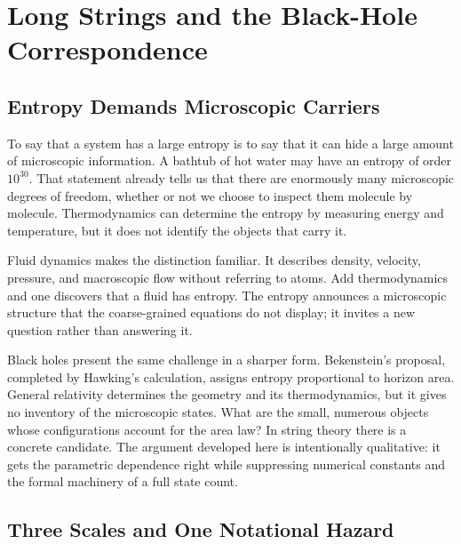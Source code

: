 \chapter{Long Strings and the Black-Hole Correspondence}


\section{Entropy Demands Microscopic Carriers}

To say that a system has a large entropy is to say that it can hide a large amount of microscopic information. A bathtub of hot water may have an entropy of order \(10^{30}\). That statement already tells us that there are enormously many microscopic degrees of freedom, whether or not we choose to inspect them molecule by molecule. Thermodynamics can determine the entropy by measuring energy and temperature, but it does not identify the objects that carry it.

Fluid dynamics makes the distinction familiar. It describes density, velocity, pressure, and macroscopic flow without referring to atoms. Add thermodynamics and one discovers that a fluid has entropy. The entropy announces a microscopic structure that the coarse-grained equations do not display; it invites a new question rather than answering it.

Black holes present the same challenge in a sharper form. Bekenstein's proposal, completed by Hawking's calculation, assigns entropy proportional to horizon area. General relativity determines the geometry and its thermodynamics, but it gives no inventory of the microscopic states. What are the small, numerous objects whose configurations account for the area law? In string theory there is a concrete candidate. The argument developed here is intentionally qualitative: it gets the parametric dependence right while suppressing numerical constants and the formal machinery of a full state count.

\section{Three Scales and One Notational Hazard}


